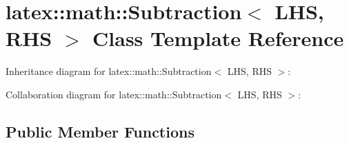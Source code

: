 \hypertarget{classlatex_1_1math_1_1Subtraction}{\section{latex\-:\-:math\-:\-:\-Subtraction$<$ \-L\-H\-S, \-R\-H\-S $>$ \-Class \-Template \-Reference}
\label{classlatex_1_1math_1_1Subtraction}
}


\-Inheritance diagram for latex\-:\-:math\-:\-:\-Subtraction$<$ \-L\-H\-S, \-R\-H\-S $>$\-:


\-Collaboration diagram for latex\-:\-:math\-:\-:\-Subtraction$<$ \-L\-H\-S, \-R\-H\-S $>$\-:
\subsection*{\-Public \-Member \-Functions}
